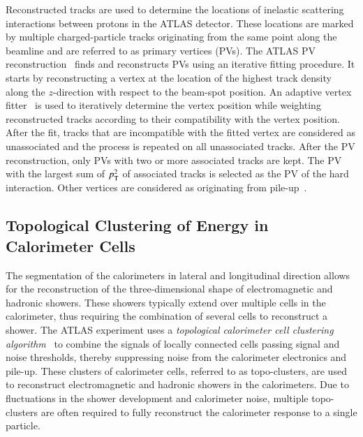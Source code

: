 Reconstructed tracks are used to determine the locations of inelastic scattering
interactions between protons in the ATLAS detector. These locations are marked
by multiple charged-particle tracks originating from the same point along the
beamline and are referred to as primary vertices (PVs).
The ATLAS PV reconstruction~\cite{PERF-2015-01} finds and reconstructs PVs using
an iterative fitting procedure. It starts by reconstructing a vertex at the
location of the highest track density along the $z$-direction with respect to the
beam-spot position. An adaptive vertex fitter~\cite{Fruhwirth:2007hz} is used to
iteratively determine the vertex position while weighting reconstructed tracks
according to their compatibility with the vertex position. After the fit, tracks
that are incompatible with the fitted vertex are considered as unassociated and
the process is repeated on all unassociated tracks. After the PV reconstruction,
only PVs with two or more associated tracks are kept. The PV with the largest sum of
$p_{\text{T}}^2$ of associated tracks is selected as the PV of the hard
interaction. Other vertices are considered as originating from
pile-up~\cite{PERF-2015-01}.


\subsection{Topological Clustering of Energy in Calorimeter Cells}

The segmentation of the calorimeters in lateral and longitudinal direction
allows for the reconstruction of the three-dimensional shape of electromagnetic
and hadronic showers. These showers typically extend over multiple cells in the
calorimeter, thus requiring the combination of several cells to reconstruct a
shower. The ATLAS experiment uses a \emph{topological calorimeter cell
  clustering algorithm}~\cite{PERF-2014-07} to combine the signals of locally
connected cells passing signal and noise thresholds, thereby suppressing noise
from the calorimeter electronics and pile-up. These clusters of calorimeter
cells, referred to as topo-clusters, are used to reconstruct electromagnetic and
hadronic showers in the calorimeters. Due to fluctuations in the shower
development and calorimeter noise, multiple topo-clusters are often required to
fully reconstruct the calorimeter response to a single particle.

